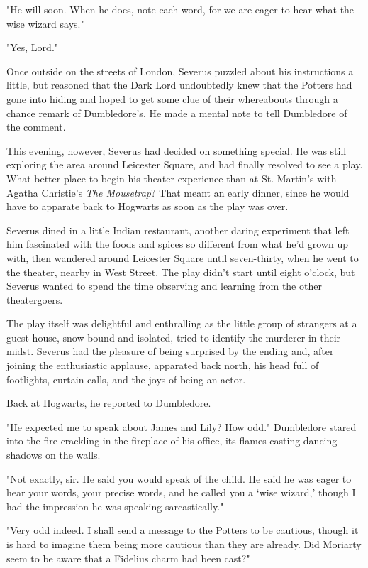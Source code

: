 \documentclass[a4paper,11pt]{article}
\begin{document}
"He will soon. When he does, note each word, for we are eager to hear what the wise wizard says."

"Yes, Lord."

Once outside on the streets of London, Severus puzzled about his instructions a little, but reasoned that the Dark Lord undoubtedly knew that the Potters had gone into hiding and hoped to get some clue of their whereabouts through a chance remark of Dumbledore's. He made a mental note to tell Dumbledore of the comment.

This evening, however, Severus had decided on something special. He was still exploring the area around Leicester Square, and had finally resolved to see a play. What better place to begin his theater experience than at St. Martin's with Agatha Christie's \emph{The Mousetrap}? That meant an early dinner, since he would have to apparate back to Hogwarts as soon as the play was over.

Severus dined in a little Indian restaurant, another daring experiment that left him fascinated with the foods and spices so different from what he'd grown up with, then wandered around Leicester Square until seven-thirty, when he went to the theater, nearby in West Street. The play didn't start until eight o'clock, but Severus wanted to spend the time observing and learning from the other theatergoers.

The play itself was delightful and enthralling as the little group of strangers at a guest house, snow bound and isolated, tried to identify the murderer in their midst. Severus had the pleasure of being surprised by the ending and, after joining the enthusiastic applause, apparated back north, his head full of footlights, curtain calls, and the joys of being an actor.

Back at Hogwarts, he reported to Dumbledore.

"He expected me to speak about James and Lily? How odd." Dumbledore stared into the fire crackling in the fireplace of his office, its flames casting dancing shadows on the walls.

"Not exactly, sir. He said you would speak of the child. He said he was eager to hear your words, your precise words, and he called you a `wise wizard,' though I had the impression he was speaking sarcastically."

"Very odd indeed. I shall send a message to the Potters to be cautious, though it is hard to imagine them being more cautious than they are already. Did Moriarty seem to be aware that a Fidelius charm had been cast?"
\end{document}
